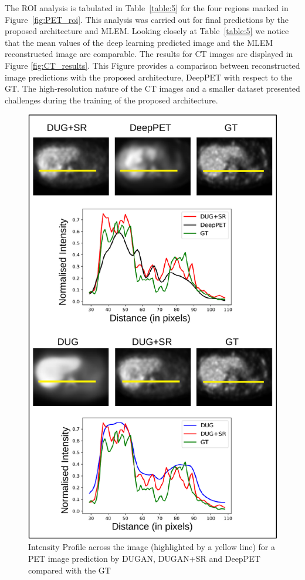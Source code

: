 The \ac{ROI} analysis is tabulated in Table~\ref{table:5} for the four regions marked in Figure~\ref{fig:PET_roi}. This analysis was carried out for final predictions by the proposed architecture and \ac{MLEM}. Looking closely at Table~\ref{table:5} we notice that the mean values of the deep learning predicted image and the \ac{MLEM} reconstructed image are comparable. The results for \ac{CT} images are displayed in Figure \ref{fig:CT_results}. This Figure provides a comparison between reconstructed image predictions with the proposed architecture, DeepPET with respect to the \ac{GT}. The high-resolution nature of the \ac{CT} images and a smaller dataset presented challenges during the training of the proposed architecture. 

\begin{figure}[!htbp]
	\centering
	\includegraphics[width=0.8\linewidth]{./Figures/PET_ip2-crop.pdf}
	\caption{Intensity Profile across the image (highlighted by a yellow line) for a \ac{PET} image prediction by \ac{DUGAN}, \ac{DUGAN}+SR and DeepPET compared with the \ac{GT}}
	\label{fig:PET_ip}
\end{figure}

